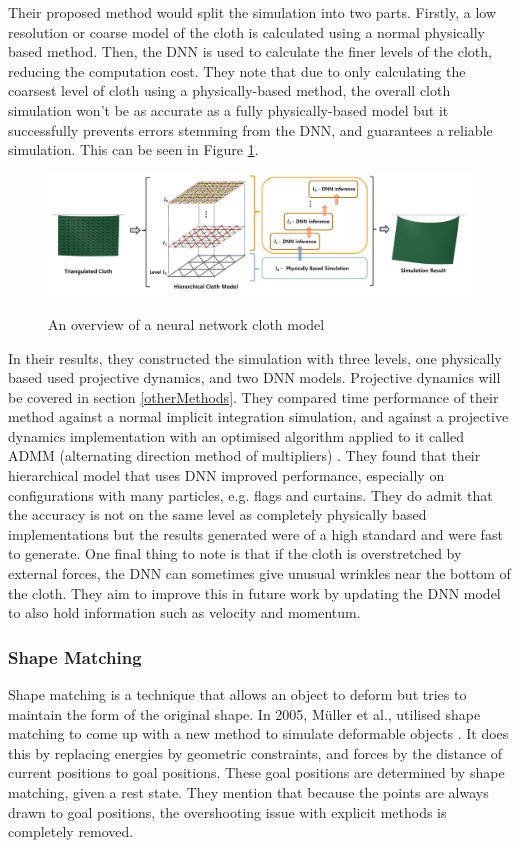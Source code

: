\documentclass[12pt,a4paper]{article}
\begin{document}
Their proposed method would split the simulation into two parts. Firstly, a low resolution or coarse model of the cloth is calculated using a normal physically based method. Then, the DNN is used to calculate the finer levels of the cloth, reducing the computation cost. They note that due to only calculating the coarsest level of cloth using a physically-based method, the overall cloth simulation won't be as accurate as a fully physically-based model but it successfully prevents errors stemming from the DNN, and guarantees a reliable simulation. This can be seen in Figure \ref{fig:DNN}.
\begin{figure}[h]
	\caption{An overview of a neural network cloth model}
	\includegraphics[width=\textwidth]{DNN.png}
	\label{fig:DNN}
\end{figure}

In their results, they constructed the simulation with three levels, one physically based used projective dynamics, and two DNN models. Projective dynamics will be covered in section \ref{otherMethods}. They compared time performance of their method against a normal implicit integration simulation, and against a projective dynamics implementation with an optimised algorithm applied to it called ADMM (alternating direction method of multipliers) \cite{ADMM}. They found that their hierarchical model that uses DNN improved performance, especially on configurations with many particles, e.g. flags and curtains. They do admit that the accuracy is not on the same level as completely physically based implementations but the results generated were of a high standard and were fast to generate. One final thing to note is that if the cloth is overstretched by external forces, the DNN can sometimes give unusual wrinkles near the bottom of the cloth. They aim to improve this in future work by updating the DNN model to also hold information such as velocity and momentum.


\subsubsection{Shape Matching}
Shape matching is a technique that allows an object to deform but tries to maintain the form of the original shape. In 2005, Müller et al., utilised shape matching to come up with a new method to simulate deformable objects \cite{ogshapematching}. It does this by replacing energies by geometric constraints, and forces by the distance of current positions to goal positions. These goal positions are determined by shape matching, given a rest state. They mention that because the points are always drawn to goal positions, the overshooting issue with explicit methods is completely removed.\\
\end{document}

